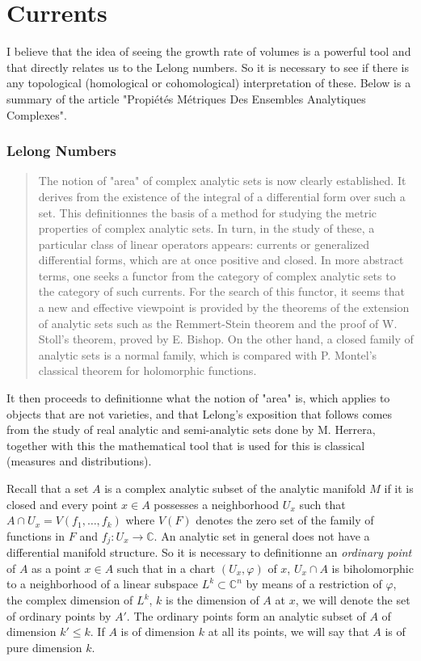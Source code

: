 \documentclass[12pt,twoside,a4paper]{report}
\begin{document}
\chapter{Currents}
\noindent I believe that the idea of seeing the growth rate of volumes is a powerful tool and that directly relates us to the Lelong numbers. So it is necessary to see if there is any topological (homological or cohomological) interpretation of these. Below is a summary of the article "Propiétés Métriques Des Ensembles Analytiques Complexes".
\subsection{Lelong Numbers}
\begin{quote}
The notion of "area" of complex analytic sets is now clearly established. It derives from the existence of the integral of a differential form over such a set. This definitionnes the basis of a method for studying the metric properties of complex analytic sets. In turn, in the study of these, a particular class of linear operators appears: currents or generalized differential forms, which are at once positive and closed. In more abstract terms, one seeks a functor from the category of complex analytic sets to the category of such currents. For the search of this functor, it seems that a new and effective viewpoint is provided by the theorems of the extension of analytic sets such as the Remmert-Stein theorem and the proof of W. Stoll's theorem, proved by E. Bishop. On the other hand, a closed family of analytic sets is a normal family, which is compared with P. Montel's classical theorem for holomorphic functions.
\end{quote}

\noindent It then proceeds to definitionne what the notion of "area" is, which applies to objects that are not varieties, and that Lelong's exposition that follows comes from the study of real analytic and semi-analytic sets done by M. Herrera, together with this the mathematical tool that is used for this is classical (measures and distributions).

Recall that a set $A$ is a complex analytic subset of the analytic manifold $M$ if it is closed and every point $x\in A$ possesses a neighborhood $U_x$ such that $A\cap U_x=V(f_1,\dots,f_k)$ where $V(F)$ denotes the zero set of the family of functions in $F$ and $f_j:U_x\rightarrow\mathbb{C}$. An analytic set in general does not have a differential manifold structure. So it is necessary to definitionne an \emph{ordinary point} of $A$ as a point $x\in A$ such that in a chart $(U_x,\varphi)$ of $x$, $U_x\cap A$ is biholomorphic to a neighborhood of a linear subspace $L^{k}\subset\mathbb{C}^n$ by means of a restriction of $\varphi$, the complex dimension of $L^{k}$, $k$ is the dimension of $A$ at $x$, we will denote the set of ordinary points by $A'$. The ordinary points form an analytic subset of $A$ of dimension $k'\leq k$. If $A$ is of dimension $k$ at all its points, we will say that $A$ is of pure dimension $k$.
\end{document}
